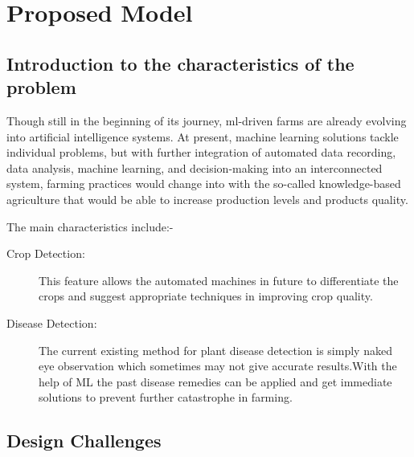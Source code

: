 \documentclass[../Report.tex]{subfiles}
\begin{document}
\chapter{Proposed Model}

\section{Introduction to the characteristics of the problem}

Though still in the beginning of its journey, \acrshort{ml}-driven farms are already evolving into artificial intelligence systems.
At present, machine learning solutions tackle individual problems, but with further integration of automated data recording,
data analysis, machine learning, and decision-making into an interconnected system, farming practices would change into with
the so-called knowledge-based agriculture that would be able to increase production levels and products quality.\par

\noindent
The main characteristics include:-
\begin{description}
  \item[Crop Detection:] This feature allows the automated machines in future to differentiate the crops and suggest appropriate 
  techniques in improving crop quality.
  
  \item[Disease Detection:] The current existing method for plant disease detection is simply naked eye observation which sometimes may not 
  give accurate results.With the help of ML the past disease remedies can be applied  and get immediate solutions to prevent further catastrophe
  in farming.
\end{description}

\section{Design Challenges}
\end{document}
